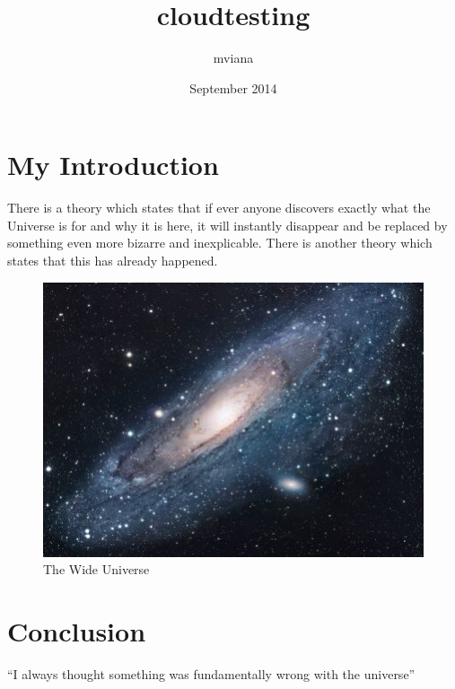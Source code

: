 \documentclass{article}
\title{cloudtesting}
\author{mviana }
\date{September 2014}
\begin{document}
\maketitle

\section{My Introduction}
There is a theory which states that if ever anyone discovers exactly what the Universe is for and why it is here, it will instantly disappear and be replaced by something even more bizarre and inexplicable.
There is another theory which states that this has already happened.

\begin{figure}[h!]
\centering
\includegraphics[scale=1.7]{universe.jpg}
\caption{The Wide Universe}
\label{fig:univerise}
\end{figure}

\section{Conclusion}
``I always thought something was fundamentally wrong with the universe'' \citep{adams1995hitchhiker}



\end{document}
